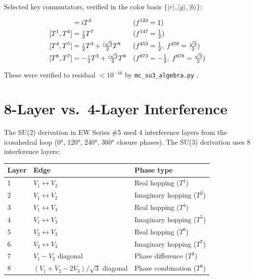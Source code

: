 \documentclass[11pt,a4paper]{article}
\newcommand{\ket}[1]{|#1\rangle}
\begin{document}
Selected key commutators, verified in the color basis
$\{\ket{r},\ket{g},\ket{b}\}$:

\begin{align}
[T^1, T^2] &= iT^3 & &(f^{123} = 1) \notag\\
[T^1, T^4] &= \tfrac{i}{2}T^7 & &(f^{147} = \tfrac{1}{2})\notag\\
[T^4, T^5] &= \tfrac{i}{2}T^3 + \tfrac{i\sqrt{3}}{2}T^8
& &(f^{453} = \tfrac{1}{2},\; f^{458} = \tfrac{\sqrt{3}}{2})\notag\\
[T^6, T^7] &= -\tfrac{i}{2}T^3 + \tfrac{i\sqrt{3}}{2}T^8
& &(f^{673} = -\tfrac{1}{2},\; f^{678} = \tfrac{\sqrt{3}}{2})\notag
\end{align}

These were verified to residual $< 10^{-16}$ by
\texttt{mc\_su3\_algebra.py} \citep{cpp_ss_mc}.

\section{8-Layer vs.\ 4-Layer Interference}
\label{app:layers}

The SU(2) derivation in EW Series \#5 used 4 interference layers
from the icosahedral loop (0°, 120°, 240°, 360° closure phases).
The SU(3) derivation uses 8 interference layers:

\begin{center}
\begin{tabular}{@{}lll@{}}
\toprule
Layer & Edge & Phase type \\
\midrule
1 & $V_1 \leftrightarrow V_2$ & Real hopping ($T^1$) \\
2 & $V_1 \leftrightarrow V_2$ & Imaginary hopping ($T^2$) \\
3 & $V_1 \leftrightarrow V_3$ & Real hopping ($T^4$) \\
4 & $V_1 \leftrightarrow V_3$ & Imaginary hopping ($T^5$) \\
5 & $V_2 \leftrightarrow V_3$ & Real hopping ($T^6$) \\
6 & $V_2 \leftrightarrow V_3$ & Imaginary hopping ($T^7$) \\
7 & $V_1 - V_2$ diagonal & Phase difference ($T^3$) \\
8 & $(V_1+V_2-2V_3)/\sqrt{3}$ diagonal & Phase combination ($T^8$) \\
\bottomrule
\end{tabular}
\end{center}
\end{document}
